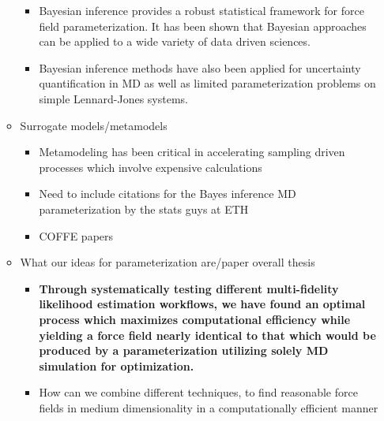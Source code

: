 \documentclass[aps,pre,nofootinbib,superscriptaddress,linenumbers,10pt, draft,tightenlines]{revtex4-1}
\begin{document}
\begin{itemize}
\begin{itemize}
\begin{itemize}
    		\item Bayesian inference provides a robust statistical framework for force field parameterization. 
    		      It has been shown that Bayesian approaches can be applied to a wide variety of data driven sciences.
    		      \cite{bayes1,bayes2,bayes3,bayes5,bayes6,bayes7,bayes8,bayes_coarse} 
    		\item Bayesian inference methods have also been applied for uncertainty quantification in MD as well as limited parameterization
    		      problems on simple Lennard-Jones systems. \cite{bayes4,UQMDrizzi,LJexpBayes}
    	\end{itemize}
        \item Surrogate models/metamodels
        \begin{itemize}
        	\item Metamodeling has been critical in accelerating sampling driven processes which involve expensive calculations \cite{mbar}
        	\item Need to include citations for the Bayes inference MD parameterization by the stats guys at ETH \cite{LJexpBayes}
    	    \item COFFE papers \cite{CoffeFull}    	    
        \end{itemize}    
        \item What our ideas for parameterization are/paper overall thesis
        \begin{itemize}
        	\item \textbf{Through systematically testing different multi-fidelity likelihood estimation workflows, we have found an optimal process which 
        	      maximizes computational efficiency while yielding a force field nearly identical to that which would be produced
        	      by a parameterization utilizing solely MD simulation for optimization.}
            \item How can we combine different techniques, to find reasonable force fields in medium dimensionality in a computationally efficient manner
            
        \end{itemize}    
    \end{itemize}
\end{itemize}
\end{document}
